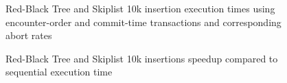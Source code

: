 \begin{figure}[!htb]
    \centering
    \vspace{-0.3cm}
    \caption{Red-Black Tree and Skiplist 10k insertion execution times using encounter-order and commit-time transactions and corresponding abort rates}
    \label{fig:plots10k-insert}
\end{figure}

\begin{figure}[!htb]
    \centering
    \vspace{-0.3cm}
    \caption{Red-Black Tree and Skiplist 10k insertions speedup compared to sequential execution time}
    \label{fig:plots10k-speedup}
\end{figure}

